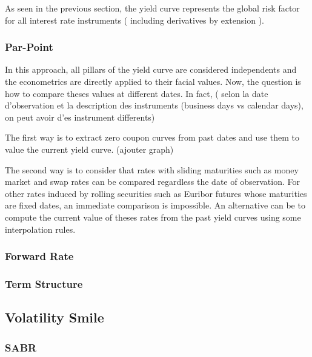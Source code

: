 \documentclass[3pt]{article}
\begin{document}
\bigskip As seen in the previous section, the yield curve represents the
global risk factor for all interest rate instruments ( including derivatives
by extension ).

\subsubsection{Par-Point}

In this approach, all pillars of the yield curve are considered independents
and the econometrics are directly applied to their facial values. Now, the
question is how to compare theses values at different dates. In fact, (
selon la date d'observation et la description des instruments (business days
vs calendar days), on peut avoir d'es instrument differents)

\bigskip

The first way is to extract zero coupon curves from past dates and use them
to value the current yield curve. (ajouter graph)

\bigskip

\bigskip

\bigskip

The second way is to consider that rates with sliding maturities such as
money market and swap rates can be compared regardless the date of
observation. For other rates induced by rolling securities such as Euribor
futures whose maturities are fixed dates, an immediate comparison is
impossible. An alternative can be to compute the current value of theses
rates from the past yield curves using some interpolation rules.

\subsubsection{Forward Rate}

\subsubsection{Term Structure}

\subsection{Volatility Smile}

\bigskip

\subsubsection{SABR}
\end{document}
